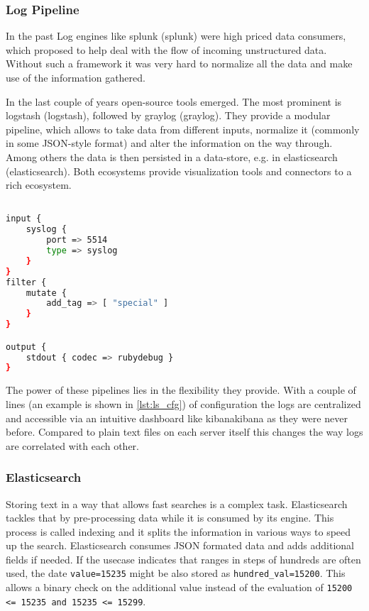 \subsubsection{Log Pipeline}
In the past Log engines like \gls{splunk} (\glsdesc{splunk}) were high priced data consumers, which proposed to help deal with the
flow of incoming unstructured data. Without such a framework it was very hard to normalize all the data and make use of the information gathered.

In the last couple of years open-source tools emerged. The most prominent is \gls{logstash} (\glsdesc{logstash}),
followed by \gls{graylog} (\glsdesc{graylog}).
They provide a modular pipeline, which allows to take data from different inputs, normalize it (commonly in some JSON-style format)
and alter the information on the way through. Among others the data is then persisted in a data-store, e.g. in \gls{elasticsearch} (\glsdesc{elasticsearch}).
Both ecosystems provide visualization tools and connectors to a rich ecosystem.

\begin{lstlisting}[language=bash,label={lst:ls_cfg},
    caption={Basic Logstash configuration}]

input {
    syslog {
        port => 5514
        type => syslog
    }
}
filter {
    mutate {
        add_tag => [ "special" ]
    }
}

output {
    stdout { codec => rubydebug }
}
\end{lstlisting}

The power of these pipelines lies in the flexibility they provide. With a couple of lines (an example is shown in \autoref{lst:ls_cfg}) of
configuration the logs are centralized and accessible via an intuitive dashboard like \gls{kibana}\glsdesc{kibana} as they were never before. Compared to plain text files on each server itself this changes the way logs are correlated with each other.

\subsubsection{Elasticsearch}
Storing text in a way that allows fast searches is a complex task. Elasticsearch tackles that by pre-processing data while it is consumed by its engine.
This process is called indexing and it splits the information in various ways to speed up the search.
Elasticsearch consumes JSON formated data and adds additional fields if needed.
If the usecase indicates that ranges in steps of hundreds are often used, the date \lstinline{value=15235} might be also stored
as \lstinline{hundred_val=15200}. This allows a binary check on the additional value instead of the evaluation of \lstinline{15200 <= 15235 and 15235 <= 15299}.

